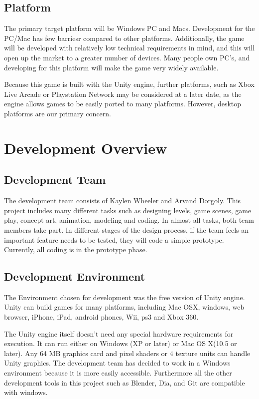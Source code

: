 \documentclass{article}
\begin{document}
\subsection{Platform}
The primary target platform will be Windows PC and Macs.  Development for the PC/Mac has few barriesr compared to other platforms.  Additionally, the game will be developed with relatively low technical requirements in mind, and this will open up the market to a greater number of devices.  Many people own PC's, and developing for this platform will make the game very widely available.

Because this game is built with the Unity engine, further platforms, such as Xbox Live Arcade or Playstation Network may be considered at a later date, as the engine allows games to be easily ported to many platforms.  However, desktop platforms are our primary concern.

\section{Development Overview}

\subsection{Development Team}

The development team consists of Kaylen Wheeler and Arvand Dorgoly. This project includes many different tasks such as designing levels, game scenes, game play, concept art, animation, modeling and coding. In almost all tasks, both team members take part. In different stages of the design process, if the team feels an important feature needs to be tested, they will code a simple prototype.  Currently, all coding is in the prototype phase.

\subsection{Development Environment}

The Environment chosen for development was the free version of Unity engine.  Unity can build games for many platforms, including Mac OSX, windows, web browser, iPhone, iPad, android phones, Wii, ps3 and Xbox 360.

The Unity engine itself doesn’t need any special hardware requirements for execution.  It can run either on Windows (XP or later) or Mac OS X(10.5 or later).  Any 64 MB graphics card and pixel shaders or 4 texture units can handle Unity graphics.  The development team has decided to work in a Windows environment because it is more easily accessible. Furthermore all the other development tools in this project such as Blender, Dia, and Git are compatible with windows.
\end{document}

